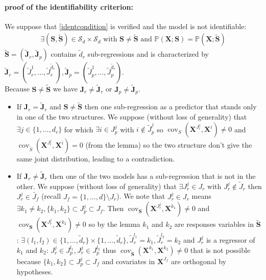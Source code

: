 \documentclass[12pt,a4paper]{report}
\begin{document}
\begin{appendices}
\paragraph{proof of the identifiability criterion:} We suppose that \ref{identcondition} is verified and the model is not identifiable:
\begin{eqnarray}
	\exists (\boldsymbol{S},\tilde{\boldsymbol{S}}) \in \mathcal{S}_d\times \mathcal{S}_d \textrm{ with } \boldsymbol{S} \neq \tilde{\boldsymbol{S}} \textrm{ and }
	\mathbb{P}(\boldsymbol{X};\boldsymbol{S})=\mathbb{P}(\boldsymbol{X};\tilde{\boldsymbol{S}})
 \end{eqnarray}
 $\tilde{\boldsymbol{S}}=(\tilde{\boldsymbol{J}}_r,\tilde{\boldsymbol{J}}_p)$ contains $\tilde{d}_r$ sub-regressions and is characterized by $\tilde{\boldsymbol{J}}_r=(\tilde{J}_r^1,\dots,\tilde{J}_r^{\tilde{d}_r}),\tilde{\boldsymbol{J}}_p=(\tilde{J}_p^1,\dots,\tilde{J}_p^{\tilde{d}_r})$.\\
Because $\boldsymbol{S}\neq \tilde{\boldsymbol{S}} $ we have $\boldsymbol{J}_r\neq \tilde{\boldsymbol{J}}_r$ or $\boldsymbol{J}_p\neq \tilde{\boldsymbol{J}}_p$.
\begin{itemize}
\item If $\boldsymbol{J}_r = \tilde{\boldsymbol{J}}_r$ and $\boldsymbol{S}\neq \tilde{\boldsymbol{S}}$ then one sub-regression as a predictor that stands only in one of the two structures. We suppose (without loss of generality) that $\exists j \in \{1,\dots,d_r\}$ for which
$\exists i \in J_p^j$ with $i \notin \tilde{J}_p^j$ so $\operatorname{cov}_{S}(\boldsymbol{X}^{J_r^j},\boldsymbol{X}^{i})\neq 0$ and $\operatorname{cov}_{\tilde{S}}(\boldsymbol{X}^{J_r^j},\boldsymbol{X}^{i})= 0$ (from the lemma) so the two structure don't give the same joint distribution, leading to a contradiction.
\item If $\boldsymbol{J}_r\neq \tilde{\boldsymbol{J}}_r$ then one of the two models has a sub-regression that is not in the other. We suppose (without loss of generality) that
 $\exists J_r^j \in J_r$ with $J_r^j \notin \tilde{J}_r$ then $J_r^j\in \tilde{J_f}$ (recall $J_f=\{1,\dots,d \}\setminus J_r$). We note that $J_r^j \in J_r$ means $\exists k_1\neq k_2, \{k_1,k_2 \}\subset J_p^j \subset J_f$. Then $\operatorname{cov}_{\boldsymbol{S}}(\boldsymbol{X}^{J_r^j},\boldsymbol{X}^{k_1})\neq 0$ and $\operatorname{cov}_{\boldsymbol{S}}(\boldsymbol{X}^{J_r^j},\boldsymbol{X}^{k_2})\neq 0 $ so by the lemma $k_1$ and $k_2$ are responses variables in $\tilde{\boldsymbol{S}}$: $\exists (l_1,l_2) \in \{1,\dots,\tilde{d}_r \}\times \{1,\dots,\tilde{d}_r \}, \tilde{J}_r^{l_1}=k_1,\tilde{J}_r^{l_2}=k_2$ and $J_r^j$ is a regressor of $k_1$ and $k_2$: $J_r^j \in J_p^{l_1}, J_r^j \in J_p^{l_2}$ thus $\operatorname{cov}_{\tilde{\boldsymbol{S}}}(\boldsymbol{X}^{k_1},\boldsymbol{X}^{k_2})\neq 0$ that is not possible because $ \{k_1,k_2 \}\subset J_p^j \subset J_f$ and covariates in $\boldsymbol{X}^{J_f}$ are orthogonal by hypotheses.
\end{itemize}


\end{appendices}
\end{document}
